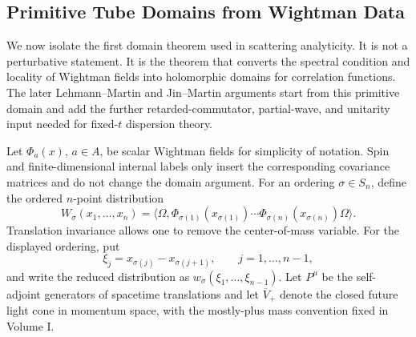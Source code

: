 \subsection{Primitive Tube Domains from Wightman Data}
\label{subsec:primitive-wightman-tube-domains}

We now isolate the first domain theorem used in scattering analyticity.  It is
not a perturbative statement.  It is the theorem that converts the spectral
condition and locality of Wightman fields into holomorphic domains for
correlation functions.  The later Lehmann--Martin and Jin--Martin arguments
start from this primitive domain and add the further retarded-commutator,
partial-wave, and unitarity input needed for fixed-\(t\) dispersion theory.

Let \(\Phi_a(x)\), \(a\in A\), be scalar Wightman fields for simplicity of
notation.  Spin and finite-dimensional internal labels only insert the
corresponding covariance matrices and do not change the domain argument.  For
an ordering \(\sigma\in S_n\), define the ordered \(n\)-point distribution
\[
  W_\sigma(x_1,\ldots,x_n)
  =
  \langle\Omega,
    \Phi_{\sigma(1)}(x_{\sigma(1)})
    \cdots
    \Phi_{\sigma(n)}(x_{\sigma(n)})
  \Omega\rangle .
\]
Translation invariance allows one to remove the center-of-mass variable.  For
the displayed ordering, put
\[
  \xi_j=x_{\sigma(j)}-x_{\sigma(j+1)},
  \qquad j=1,\ldots,n-1,
\]
and write the reduced distribution as \(w_\sigma(\xi_1,\ldots,\xi_{n-1})\).
Let \(P^\mu\) be the self-adjoint generators of spacetime translations and
let \(\overline V_+\) denote the closed future light cone in momentum space,
with the mostly-plus mass convention fixed in Volume I.


